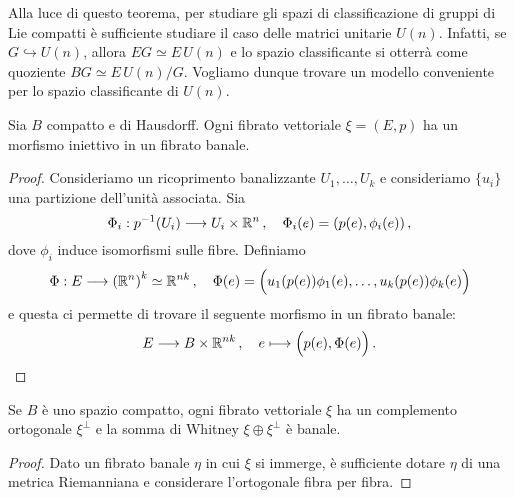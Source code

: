 Alla luce di questo teorema, per studiare gli spazi di classificazione
di gruppi di Lie compatti è sufficiente studiare
il caso delle matrici unitarie $U(n)$. Infatti,
se $G \hookrightarrow U(n)$, allora $EG \simeq E\,U(n)$
e lo spazio classificante si otterrà come quoziente $BG \simeq E\,U(n) / G$.
Vogliamo dunque trovare un modello conveniente per lo spazio classificante di $U(n)$.

\begin{lemma}
	Sia $B$ compatto e di Hausdorff. Ogni fibrato vettoriale $\xi = (E,p)$
	ha un morfismo iniettivo in un fibrato banale.
	\begin{proof}
		Consideriamo un ricoprimento banalizzante $U_{1}, \dots, U_{k}$
		e consideriamo $\{ u_{i} \}$ una partizione dell'unità associata.
		Sia 
		\begin{equation*}
			\Phi_{i} : p^{-1}(U_{i}) \longrightarrow U_{i} \times \R^{n}\,,
			\quad \Phi_{i}(e) = (p(e), \phi_{i}(e))\,,
		\end{equation*}
		dove $\phi_{i}$ induce isomorfismi sulle fibre. Definiamo
		\begin{equation*}
			\Phi : E \longrightarrow \left( \R^{n} \right)^{k} \simeq \R^{nk}\,,
			\quad \Phi(e) = \Big( u_{1}(p(e)) \phi_{1}(e), \dots, u_{k}(p(e)) \phi_{k}(e) \Big)
		\end{equation*}
		e questa ci permette di trovare il seguente morfismo in un fibrato banale:
		\begin{equation*}
			E \longrightarrow B \times {\mathbb R}^{nk}\,,
			\quad e \longmapsto \Big( p(e), \Phi(e) \Big)\,.
		\end{equation*}
	\end{proof}
\end{lemma}

\begin{cor}
	Se $B$ è uno spazio compatto, ogni fibrato vettoriale $\xi$
	ha un complemento ortogonale $\xi^{\perp}$ e la somma
	di Whitney $\xi \oplus \xi^{\perp}$ è banale.
	\begin{proof}
		Dato un fibrato banale $\eta$ in cui $\xi$ si immerge,
		è sufficiente dotare $\eta$ di una metrica Riemanniana e 
		considerare l'ortogonale fibra per fibra.
	\end{proof}
\end{cor}


